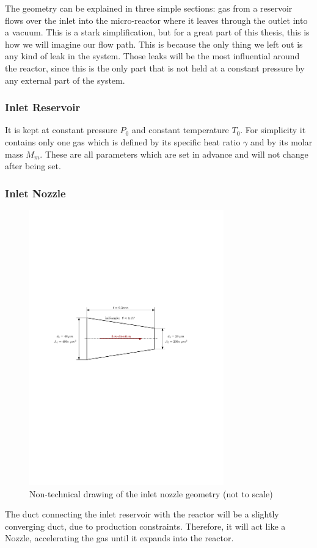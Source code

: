 	The geometry can be explained in three simple sections: gas from a reservoir flows over the inlet into the micro-reactor where it leaves through the outlet into a vacuum. 
	This is a stark simplification, but for a great part of this thesis, this is how we will imagine our flow path.
	This is because the only thing we left out is any kind of leak in the system.
	Those leaks will be the most influential around the reactor, since this is the only part that is not held at a constant pressure by any external part of the system.\\
\subsubsection*{Inlet Reservoir}

	It is kept at constant pressure \(P_0\) and constant temperature \(T_0\).
	For simplicity it contains only one gas which is defined by its specific heat ratio \(\gamma\) and by its molar mass \(M_m\).
	These are all parameters which are set in advance and will not change after being set.
	
\subsubsection*{Inlet Nozzle}

	\begin{figure}[H]
	    \centering
	    \includegraphics[width=0.75\textwidth]{src/03_analytical-work/fig_inlet-nozzle-geometry.pdf}
	    \caption{Non-technical drawing of the inlet nozzle geometry (not to scale)}
	    \label{fig:geometry-inlet-nozzle}
	\end{figure}
	The duct connecting the inlet reservoir with the reactor will be a slightly converging duct, due to production constraints.
	Therefore, it will act like a Nozzle, accelerating the gas until it expands into the reactor.
	
